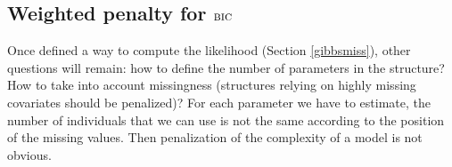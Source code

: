 \documentclass[12pt,a4paper]{report}
\begin{document}
%
%
%
	\subsection{Weighted penalty for $\mbox{{\sc bic}}$}
			Once defined a way to compute the likelihood (Section \ref{gibbsmiss}), other questions will remain: how to define the number of parameters in the structure? How to take into account missingness (structures relying on highly missing covariates should be penalized)?
			For each parameter we have to estimate, the number of individuals that we can use is not the same according to the position of the missing values. Then penalization of the complexity of a model is not obvious.
			
\end{document}
